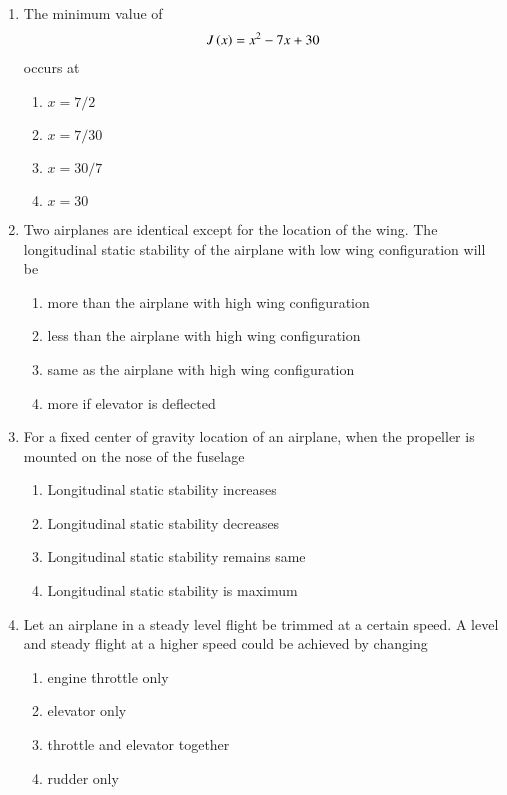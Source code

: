 \documentclass[journal]{IEEEtran}
\begin{document}
\begin{enumerate}
    \item The minimum value of 
    \begin{align*}
       J\left(x\right) = x^2 -7x +30
    \end{align*}occurs at 
    \begin{enumerate}
        \item $x = 7/2$
        \item $x = 7/30$
        \item $x = 30/7$
        \item $x = 30$ \\
    \end{enumerate}

    \item Two airplanes are identical except for the location of the wing. The longitudinal static stability of the airplane with low wing configuration will be 
    \begin{enumerate}
        \item more than the airplane with high wing configuration
        \item less than the airplane with high wing configuration
        \item same as the airplane with high wing configuration
        \item more if elevator is deflected \\
    \end{enumerate}

    \item For a fixed center of gravity location of an airplane, when the propeller is mounted on the nose of the fuselage
    \begin{enumerate}
        \item Longitudinal static stability increases
        \item Longitudinal static stability decreases
        \item Longitudinal static stability remains same
        \item Longitudinal static stability is maximum \\
    \end{enumerate}

    \item Let an airplane in a steady level flight be trimmed at a certain speed. A level and steady flight at a higher speed could be achieved by changing 
    \begin{enumerate}
        \item engine throttle only
        \item elevator only
        \item throttle and elevator together 
        \item rudder only \\
    \end{enumerate}


\end{enumerate}
\end{document}
